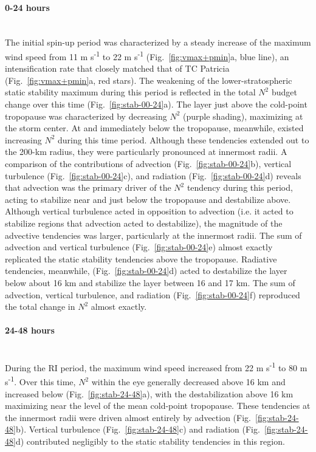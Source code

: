 \documentclass{ametsoc}
\begin{document}
\paragraph{0-24 hours}\mbox{}\\
\indent The initial spin-up period was characterized by a steady increase of the maximum wind speed from 11 m s\textsuperscript{-1} to 22 m s\textsuperscript{-1} (Fig.~\ref{fig:vmax+pmin}a, blue line), an intensification rate that closely matched that of TC Patricia (Fig.~\ref{fig:vmax+pmin}a, red stars).
The weakening of the lower-stratospheric static stability maximum during this period is reflected in the total $N^2$ budget change over this time (Fig.~\ref{fig:stab-00-24}a).
The layer just above the cold-point tropopause was characterized by decreasing $N^2$ (purple shading), maximizing at the storm center.
At and immediately below the tropopause, meanwhile, existed increasing $N^2$ during this time period.
Although these tendencies extended out to the 200-km radius, they were particularly pronounced at innermost radii.
A comparison of the contributions of advection (Fig.~\ref{fig:stab-00-24}b), vertical turbulence (Fig.~\ref{fig:stab-00-24}c), and radiation (Fig.~\ref{fig:stab-00-24}d) reveals that advection was the primary driver of the $N^2$ tendency during this period, acting to stabilize near and just below the tropopause and destabilize above.
Although vertical turbulence acted in opposition to advection (i.e. it acted to stabilize regions that advection acted to destabilize), the magnitude of the advective tendencies was larger, particularly at the innermost radii.
The sum of advection and vertical turbulence (Fig.~\ref{fig:stab-00-24}e) almost exactly replicated the static stability tendencies above the tropopause.
Radiative tendencies, meanwhile, (Fig.~\ref{fig:stab-00-24}d) acted to destabilize the layer below about 16 km and stabilize the layer between 16 and 17 km.
The sum of advection, vertical turbulence, and radiation (Fig.~\ref{fig:stab-00-24}f) reproduced the total change in $N^2$ almost exactly.

\paragraph{24-48 hours}\mbox{}\\
\indent During the RI period, the maximum wind speed increased from 22 m s\textsuperscript{-1} to 80 m s\textsuperscript{-1}.
Over this time, $N^2$ within the eye generally decreased above 16 km and increased below (Fig.~\ref{fig:stab-24-48}a), with the destabilization above 16 km maximizing near the level of the mean cold-point tropopause.
These tendencies at the innermost radii were driven almost entirely by advection (Fig.~\ref{fig:stab-24-48}b).
Vertical turbulence (Fig.~\ref{fig:stab-24-48}c) and radiation (Fig.~\ref{fig:stab-24-48}d) contributed negligibly to the static stability tendencies in this region.
\end{document}
